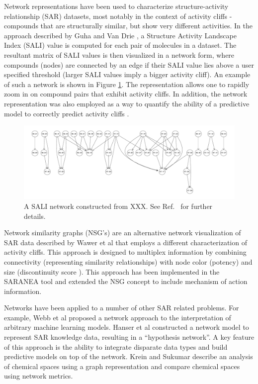 \documentclass[]{book}
\begin{document}
Network representations have been used to characterize
structure-activity relationship (SAR) datasets, most notably in the
context of activity cliffs \cite{Maggiora:2006aa} - compounds that are
structurally similar, but show very different activities. In the approach
described by Guha and Van Drie \cite{Guha:2008aa}, a Structure
Activity Landscape Index (SALI) value is computed for each pair of
molecules in a dataset. The resultant matrix of SALI values is then
visualized in a network form, where compounds (nodes) are connected by
an edge if their SALI value lies above a user specified threshold
(larger SALI values imply a bigger activity cliff). An example of such
a network is shown in Figure \ref{fig:salinet}. The representation
allows one to rapidly zoom in on compound pairs that exhibit activity
cliffs. In addition, the network representation was also employed as a
way to quantify the ability of a predictive model to correctly predict
activity cliffs \cite{Guha:2008ab}.

\begin{figure}[h]
  \centering
  \includegraphics[width=\linewidth]{img/salinet} 
  \caption{A SALI network constructed from XXX. See Ref.~\cite{Guha:2008aa} for further details.}
  \label{fig:salinet}
\end{figure}

Network similarity graphs (NSG's) are an alternative network
visualization of SAR data described by Wawer et al \cite{Wawer:2008aa}
that employs a different characterization of activity cliffs. This
approach is designed to multiplex information by combining
connectivity (representing similarity relationships) with node color
(potency) and size (discontinuity score \cite{Peltason:2007aa}). This
approach has been implemented in the SARANEA tool
\cite{Lounkine:2010fk} and extended \cite{Iyer:2011ij} the NSG concept
to include mechanism of action information.

Networks have been applied to a number of other SAR related
problems. For example, Webb et al \cite{Webb:2014tp} proposed a
network approach to the interpretation of arbitrary machine learning
models. Hanser et al \cite{Hanser:2014gl} constructed a network model
to represent SAR knowledge data, resulting in a ``hypothesis
network''. A key feature of this approach is the ability to integrate
disparate data types and build predictive models on top of the
network. Krein and Sukumar \cite{Krein:2011tt} describe an analysis of
chemical spaces using a graph representation and compare chemical
spaces using network metrics.
\end{document}
